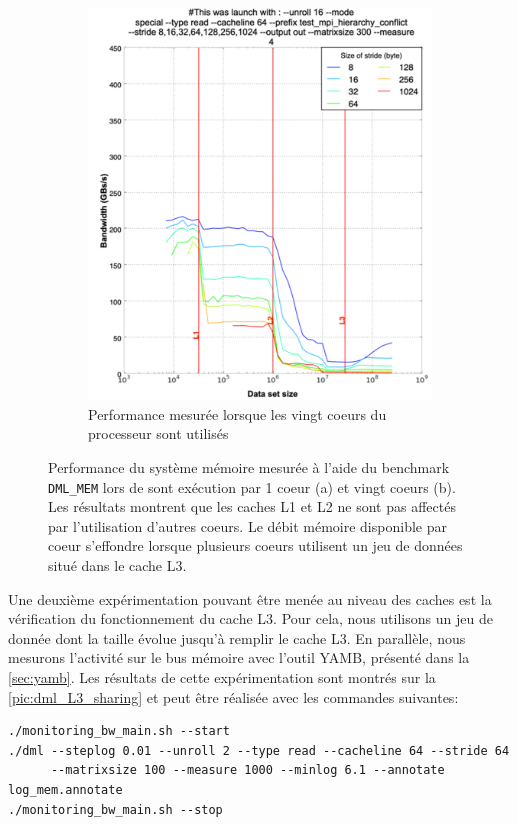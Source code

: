 \begin{figure}
\begin{subfigure}[b]{0.47\linewidth}
            \includegraphics[width=\linewidth]{images/dml_cache_20core.png}
            \caption{Performance mesurée lorsque les vingt coeurs du processeur sont utilisés}
            \label{pic:dml_cache_20core}
            \end{subfigure}
        \caption{Performance du système mémoire mesurée à l'aide du benchmark \texttt{DML\_MEM} lors de sont exécution par 1 coeur (a) et vingt coeurs (b). Les résultats montrent que les caches L1 et L2 ne sont pas affectés par l'utilisation d'autres coeurs. Le débit mémoire disponible par coeur s'effondre lorsque plusieurs coeurs utilisent un jeu de données situé dans le cache L3.}\label{pic:dml_cache}
        \end{figure}
        
        Une deuxième expérimentation pouvant être menée au niveau des caches est la vérification du fonctionnement du cache L3. Pour cela, nous utilisons un jeu de donnée dont la taille évolue jusqu'à remplir le cache L3.  En parallèle, nous mesurons l'activité sur le bus mémoire avec l'outil YAMB, présenté dans la \autoref{sec:yamb}. Les résultats de cette expérimentation sont montrés sur la \autoref{pic:dml_L3_sharing} et peut être réalisée avec les commandes suivantes:
        \begin{verbatim}
./monitoring_bw_main.sh --start
./dml --steplog 0.01 --unroll 2 --type read --cacheline 64 --stride 64  
      --matrixsize 100 --measure 1000 --minlog 6.1 --annotate log_mem.annotate
./monitoring_bw_main.sh --stop
        \end{verbatim}
        
